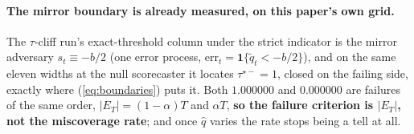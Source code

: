 \paragraph{The mirror boundary is already measured, on this paper's own grid.} The $\tau$-cliff
run's exact-threshold column under the strict indicator is the mirror adversary $s_t \equiv -b/2$
(one error process, $\mathrm{err}_t = \mathbf{1}\{\tilde{q}_t < -b/2\}$), and on the same eleven
widths at the null scorecaster it locates $\tau^{\star-} = 1$, closed on the failing side, exactly
where (\ref{eq:boundaries}) puts it.
Both $1.000000$ and $0.000000$ are failures of the same order, $|E_T| = (1-\alpha)T$ and
$\alpha T$, \textbf{so the failure criterion is $|E_T|$, not the miscoverage
rate}; and once $\hat{q}$ varies the rate stops being a tell at all.

